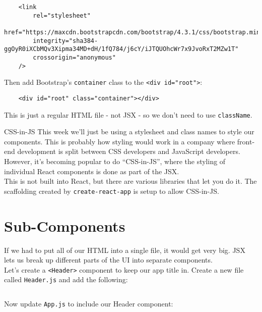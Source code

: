 \begin{verbatim}
    <link
        rel="stylesheet"
        href="https://maxcdn.bootstrapcdn.com/bootstrap/4.3.1/css/bootstrap.min.css"
        integrity="sha384-ggOyR0iXCbMQv3Xipma34MD+dH/1fQ784/j6cY/iJTQUOhcWr7x9JvoRxT2MZw1T"
        crossorigin="anonymous"
    />
\end{verbatim}

Then add Bootstrap's \texttt{container} class to the \texttt{<div id="root">}:

\begin{verbatim}
    <div id="root" class="container"></div>
\end{verbatim}

This is just a regular HTML file - not JSX - so we don't need to use \texttt{className}.


\begin{infobox}{CSS-in-JS}
    This week we'll just be using a stylesheet and class names to style our components. This is probably how styling would work in a company where front-end development is split between CSS developers and JavaScript developers.
    \\

    However, it's becoming popular to do ``CSS-in-JS'', where the styling of individual React components is done as part of the JSX.
    \\

    This is not built into React, but there are various libraries that let you do it. The scaffolding created by \texttt{create-react-app} is setup to allow CSS-in-JS.
\end{infobox}


\pagebreak


\section{Sub-Components}

If we had to put all of our HTML into a single file, it would get very big. JSX lets us break up different parts of the UI into separate components.
\\

Let's create a \texttt{<Header>} component to keep our app title in. Create a new file called \texttt{Header.js} and add the following:

\inputminted{jsx}{02-jsx/figures/03-Header.jsx}

Now update \texttt{App.js} to include our Header component:

